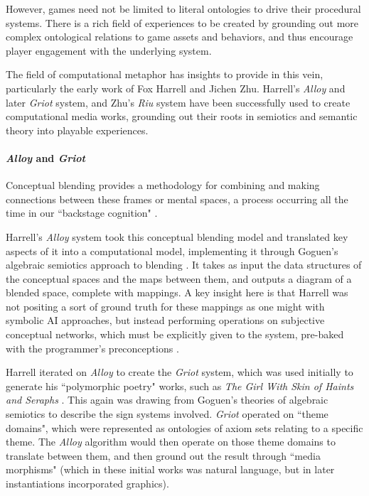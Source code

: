 However, games need not be limited to literal ontologies to drive their procedural systems. There is a rich field of experiences to be created by grounding out more complex ontological relations to game assets and behaviors, and thus encourage player engagement with the underlying system.

The field of computational metaphor has insights to provide in this vein, particularly the early work of Fox Harrell and Jichen Zhu. Harrell's \textit{Alloy} and later \textit{Griot} system, and Zhu's \textit{Riu} system have been successfully used to create computational media works, grounding out their roots in semiotics and semantic theory into playable experiences.

\paragraph{\textit{Alloy} and \textit{Griot}}\label{par:alloy-and-griot}

Conceptual blending provides a methodology for combining and making connections between these frames or mental spaces, a process occurring all the time in our ``backstage cognition" \cite{fauconnier2001conceptual}.

Harrell’s \textit{Alloy} system took this conceptual blending model and translated key aspects of it into a computational model, implementing it through Goguen’s algebraic semiotics approach to blending \cite{goguen2010style}. It takes as input the data structures of the conceptual spaces and the maps between them, and outputs a diagram of a blended space, complete with mappings. A key insight here is that Harrell was not positing a sort of ground truth for these mappings as one might with symbolic AI approaches, but instead performing operations on subjective conceptual networks, which must be explicitly given to the system, pre-baked with the programmer’s preconceptions \cite{harrell_2007}.

Harrell iterated on \textit{Alloy} to create the \textit{Griot} system, which was used initially to generate his
``polymorphic poetry" works, such as \textit{The Girl With Skin of Haints and Seraphs} \cite{harrell2005shades}. This again was drawing from Goguen’s theories of algebraic semiotics to describe the sign systems involved. \textit{Griot} operated on ``theme domains", which were represented as ontologies of axiom sets relating to a specific theme. The \textit{Alloy} algorithm would then operate on those theme domains to translate between them, and then ground out the result through ``media morphisms" (which in these initial works was natural language, but in later instantiations incorporated graphics).

